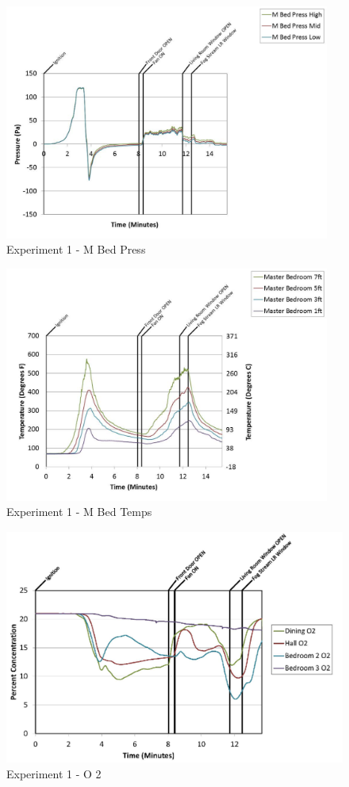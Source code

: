 \documentclass{article}
\begin{document}
\begin{appendices}
	\clearpage

	\begin{figure}[h!]
		\centering
		\includegraphics[height=3.05in]{0_Images/Results_Charts/Exp_1_Charts/MBedPress.pdf}
		\caption{Experiment 1 - M Bed Press}
	\end{figure}
 

	\begin{figure}[h!]
		\centering
		\includegraphics[height=3.05in]{0_Images/Results_Charts/Exp_1_Charts/MBedTemps.pdf}
		\caption{Experiment 1 - M Bed Temps}
	\end{figure}
 
	\clearpage

	\begin{figure}[h!]
		\centering
		\includegraphics[height=3.05in]{0_Images/Results_Charts/Exp_1_Charts/O2.pdf}
		\caption{Experiment 1 - O 2}
	\end{figure}
 


\end{appendices}
\end{document}
